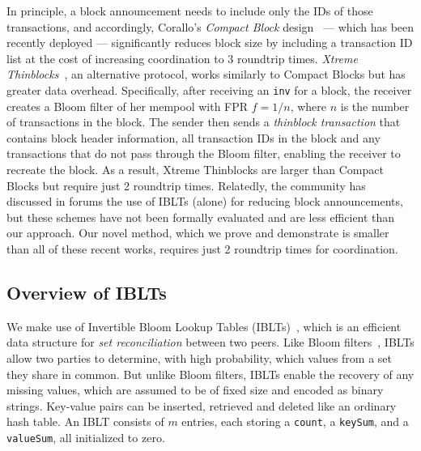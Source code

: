 In principle, a block announcement needs to include only the IDs of those transactions,
and accordingly, Corallo's {\em Compact Block} design~\cite{Corallo:2016} --- which has been recently deployed --- significantly reduces block size by including a  transaction ID list at the cost of increasing coordination to 3 roundtrip times.
%
{\em Xtreme Thinblocks}~\cite{Tschipper:2016}, an alternative protocol, works similarly to Compact Blocks but has greater data overhead. Specifically, after receiving an {\tt inv} for a
 block, the receiver creates a Bloom filter of her mempool with FPR
 $f=1/n$, where $n$ is the number of transactions in the block. The
 sender then sends a \textit{thinblock transaction} that contains
 block header information, all transaction IDs in the block and any
 transactions that do not pass through the Bloom filter, enabling the
 receiver to recreate the block.
 As a result, Xtreme Thinblocks are larger than Compact Blocks but require just 2 roundtrip times. Relatedly, the community has discussed in forums the use of IBLTs (alone) for reducing block announcements\cite{andresen:2014,Russel:2014}, but these schemes have not been formally evaluated and are less efficient than our approach. Our novel method, which we prove and demonstrate is smaller than all of these recent works, requires just 2 roundtrip times for coordination.

 \subsection{Overview of IBLTs}
We make use of Invertible Bloom Lookup Tables (IBLTs)~\cite{goodrich:2011}, which is an efficient data structure  for {\em set reconciliation} between two peers.  Like 
  Bloom filters~\cite{Bloom:1970}, IBLTs allow
  two parties to determine, with high probability, which values from a
  set they share in common.  But unlike Bloom filters, IBLTs enable the
  recovery of any missing values, which are assumed to be of fixed
  size and encoded as binary strings.  Key-value pairs can be
  inserted, retrieved and deleted like an ordinary hash table.  An
  IBLT consists of $m$ entries, each storing a \texttt{count}, a
  \texttt{keySum}, and a \texttt{valueSum}, all initialized to zero. 
  
